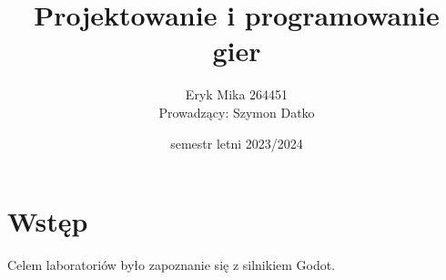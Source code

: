 \documentclass[a4paper]{article}
\title{Projektowanie i programowanie gier}
\date{semestr letni 2023/2024}
\author{
    \centering
    \begin{tabular}{c}
      Eryk Mika 264451  \\[2ex]
      Prowadzący: Szymon Datko
    \end{tabular}
  }
\begin{document}
\maketitle
\section{Wstęp}
Celem laboratoriów było zapoznanie się z silnikiem Godot.
\end{document}
